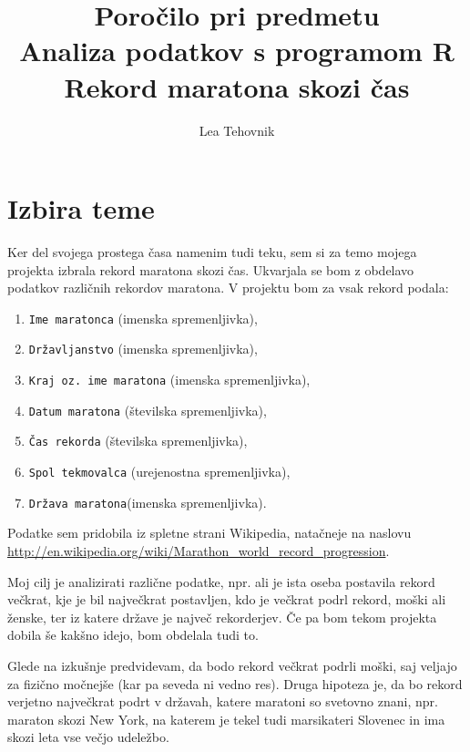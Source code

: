 \documentclass[11pt,a4paper]{article}
\begin{document}
\title{Poročilo pri predmetu \\
Analiza podatkov s programom R\\
\vspace{3mm}
\textbf{{Rekord maratona skozi čas}}}
\author{Lea Tehovnik}
\maketitle


\section{Izbira teme}

Ker del svojega prostega časa namenim tudi teku, sem si za temo mojega projekta izbrala rekord maratona skozi čas.  Ukvarjala se bom z obdelavo podatkov različnih rekordov maratona. V projektu bom za vsak rekord podala:
\begin{enumerate}
\item{\verb|Ime maratonca| (imenska spremenljivka),}
\item{\verb|Državljanstvo| (imenska spremenljivka),}
\item{\verb|Kraj oz. ime maratona| (imenska spremenljivka),}
\item{\verb|Datum maratona| (številska spremenljivka),}
\item{\verb|Čas rekorda| (številska spremenljivka),}
\item{\verb|Spol tekmovalca| (urejenostna spremenljivka),}
\item{\verb|Država maratona|(imenska spremenljivka).}
\end{enumerate}
 

Podatke sem pridobila iz spletne strani Wikipedia, natačneje na naslovu \url{http://en.wikipedia.org/wiki/Marathon_world_record_progression}.

Moj cilj je analizirati različne podatke, npr. ali je ista oseba postavila rekord večkrat, kje je bil največkrat postavljen, kdo je večkrat podrl rekord, moški ali ženske, ter iz katere države je največ rekorderjev. Če pa bom tekom projekta dobila še kakšno idejo, bom obdelala tudi to.

Glede na izkušnje predvidevam, da bodo rekord večkrat podrli moški, saj veljajo za fizično močnejše (kar pa seveda ni vedno res). Druga hipoteza je, da bo rekord verjetno največkrat podrt v državah, katere maratoni so svetovno znani, npr. maraton skozi New York, na katerem je tekel tudi marsikateri Slovenec in ima skozi leta vse večjo udeležbo.
\end{document}
